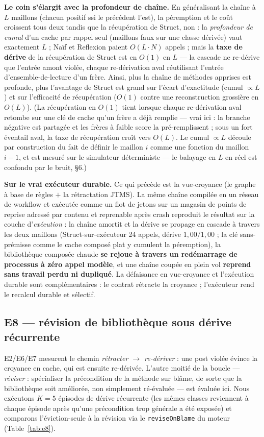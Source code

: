 \documentclass[11pt]{article}
\begin{document}
\textbf{Le coin s'élargit avec la profondeur de chaîne.} En généralisant la chaîne à $L$ maillons (chacun positif
ssi le précédent l'est), la péremption et le coût croissent tous deux tandis que la récupération de Struct, non :
la \emph{profondeur de cumul} d'un cache par rappel seul (maillons faux sur une classe dérivée) vaut
exactement $L$ ; Naïf et Reflexion paient $O(L{\cdot}N)$ appels ; mais la \textbf{taxe de dérive} de la
récupération de Struct est en $O(1)$ en $L$ --- la cascade ne re-dérive que l'entrée amont violée, chaque
re-dérivation aval réutilisant l'entrée d'ensemble-de-lecture d'un frère. Ainsi, plus la chaîne de méthodes
apprises est profonde, plus l'avantage de Struct est grand sur l'écart d'exactitude (cumul $\propto L$) et
sur l'efficacité de récupération ($O(1)$ contre une reconstruction grossière en $O(L)$). (La récupération en $O(1)$
tient lorsque chaque re-dérivation aval retombe sur une clé de cache qu'un frère a déjà remplie --- vrai ici : la
branche négative est partagée et les frères à faible score la pré-remplissent ; sous un fort éventail aval, la taxe
de récupération croît vers $O(L)$. Le cumul $\propto L$ découle par construction du fait de définir le maillon $i$
comme une fonction du maillon $i-1$, et est mesuré sur le simulateur déterministe --- le balayage en $L$ en réel est
confondu par le bruit, \S6.)

\textbf{Sur le vrai exécuteur durable.} Ce qui précède est la vue-croyance (le graphe à base de règles $+$ la
rétractation JTMS). La même chaîne compilée en un réseau de workflow et exécutée comme un flot de jetons sur un
magasin de points de reprise adressé par contenu et reprenable après crash reproduit le résultat sur la couche
d'\emph{exécution} : la chaîne amortit et la dérive se propage en cascade à travers les deux maillons
(Struct-sur-exécuteur 24 appels, dérive $1{,}00/1{,}00$ ; la clé sans-prémisse comme le cache composé plat y
cumulent la péremption), la bibliothèque composée chaude \textbf{se rejoue à travers un redémarrage de processus à
zéro appel modèle}, et une chaîne coupée en plein vol \textbf{reprend sans travail perdu ni dupliqué}. La défaisance
en vue-croyance et l'exécution durable sont complémentaires : le contrat rétracte la croyance ; l'exécuteur rend le
recalcul durable et sélectif.

\subsection{E8 --- révision de bibliothèque sous dérive récurrente}\label{sec:e8}
E2/E6/E7 mesurent le chemin \emph{rétracter $\to$ re-dériver} : une post violée évince la croyance en cache, qui est
ensuite re-dérivée. L'autre moitié de la boucle --- \emph{réviser} : spécialiser la précondition de la méthode sur
blâme, de sorte que la bibliothèque soit améliorée, non simplement ré-évaluée --- est évaluée ici. Nous exécutons
$K{=}5$ épisodes de dérive récurrente (les mêmes classes reviennent à chaque épisode après qu'une précondition trop
générale a été exposée) et comparons l'éviction-seule à la révision via le \texttt{reviseOnBlame} du moteur
(Table~\ref{tab:e8}).
\end{document}
